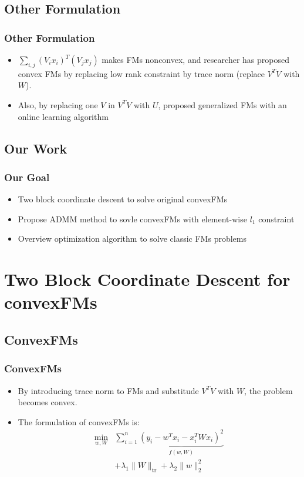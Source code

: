 \documentclass{beamer}
\begin{document}
  \subsection{Other Formulation}
  \begin{frame}
  \frametitle{Other Formulation}
    \begin{itemize}
      \item $\sum_{i, j} (V_ix_i)^T(V_jx_j)$ makes FMs nonconvex, and researcher has proposed convex FMs \cite{blondel2015convex} by replacing low rank constraint by trace norm (replace $V^TV$ with $W$).
      \item Also, by replacing one $V$ in $V^T V$ with $U$, \cite{lin2016non} proposed generalized FMs with an online learning algorithm
    \end{itemize}
  \end{frame}

  \subsection{Our Work}
  \begin{frame}
  \frametitle{Our Goal}
    \begin{itemize}
    \item Two block coordinate descent to solve original convexFMs
      \item Propose ADMM method to sovle convexFMs with element-wise $l_1$ constraint
      \item Overview optimization algorithm to solve classic FMs problems
    \end{itemize}
  \end{frame}

\section{Two Block Coordinate Descent for convexFMs} %
\subsection{ConvexFMs}
\begin{frame}
\frametitle{ConvexFMs}
\begin{itemize}
  \item By introducing trace norm to FMs and substitude $V^TV$ with $W$, the problem becomes convex.
  \item The formulation of convexFMs is:
    \begin{align*}
      \min_{w, W} & \sum_{i = 1}^n \underbrace{(y_i - w^Tx_i - x_i^T W x_i)^2}_{f(w, W)} \\
      & + \lambda_1 \|W\|_{\text{tr}} + \lambda_2 \|w\|_2^2
    \end{align*}
\end{itemize}
\end{frame}
\end{document}
